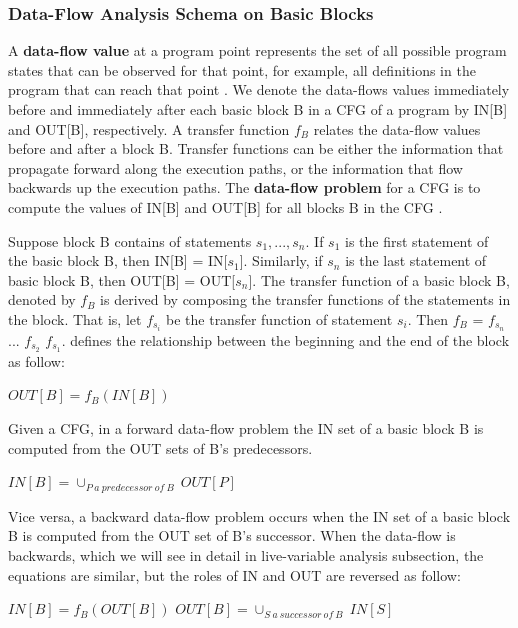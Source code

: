 \subsubsection{Data-Flow Analysis Schema on Basic Blocks}
A \textbf{data-flow value} at a program point represents the set of all possible program states that can be observed for that point, for example, all definitions in the program that can reach that point \cite{lam2006compilers}. We denote the data-flows values immediately before and immediately after each basic block B in a CFG of a program by IN[B] and OUT[B], respectively. A transfer function $f_{B}$ relates the data-flow values before and after a block B. Transfer functions can be either the information that propagate forward along the execution paths, or the information that flow backwards up the execution paths. The \textbf{data-flow problem} for a CFG is to compute the values of IN[B] and OUT[B] for all blocks B in the CFG \cite{lam2006compilers}. 

Suppose block B contains of statements $s_{1},...,s_{n}$. If $s_{1}$ is the first statement of the basic block B, then IN[B] = IN[$s_{1}$]. Similarly, if $s_{n}$ is the last statement of basic block B, then OUT[B] = OUT[$s_{n}$]. The transfer function of a basic block B, denoted by $f_{B}$ is derived by composing the transfer functions of the statements in the block. That is, let  $f_{s_{i}}$ be the transfer function of statement $s_{i}$. Then $f_{B}$ = $f_{s_{n}}$ \textopenbullet ... \textopenbullet $f_{s_{2}}$ \textopenbullet $f_{s_{1}}$. \cite{lam2006compilers} defines the relationship between the beginning and the end of the block as follow:
\begin{algorithmic}\centering
\State${OUT[B] = f_{B}(IN[B])}$
\end{algorithmic}
Given a CFG, in a forward data-flow problem the IN set of a basic block B is computed from the OUT sets of B's predecessors. 
\begin{algorithmic}\centering
\State${IN[B] = \cup_{P\:a\:predecessor\:of\:B}\:OUT[P]}$
\end{algorithmic}
Vice versa, a backward data-flow problem occurs when the IN set of a basic block B is computed from the OUT set of B's successor. When the data-flow is backwards, which we will see in detail in live-variable analysis subsection, the equations are similar, but the roles of IN and OUT are reversed as follow:
\begin{algorithmic}\centering
\State${IN[B] = f_{B}(OUT[B])}$
\State${OUT[B] = \cup_{S\:a\:successor\:of\:B}\:IN[S]}$
\end{algorithmic}

